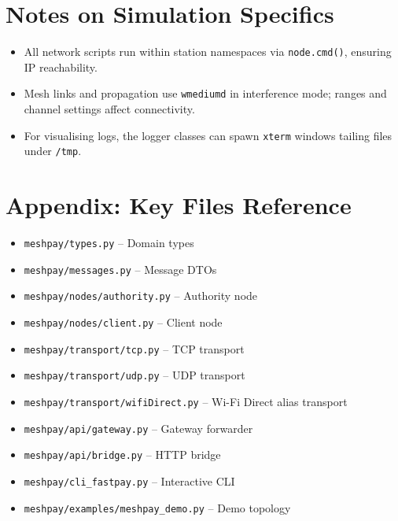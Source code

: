 \documentclass[11pt,a4paper]{article}
\begin{document}
\section{Notes on Simulation Specifics}
\begin{itemize}[noitemsep]
  \item All network scripts run within station namespaces via \texttt{node.cmd()}, ensuring IP reachability.
  \item Mesh links and propagation use \texttt{wmediumd} in interference mode; ranges and channel settings affect connectivity.
  \item For visualising logs, the logger classes can spawn \texttt{xterm} windows tailing files under \texttt{/tmp}.
\end{itemize}

\section{Appendix: Key Files Reference}
\begin{itemize}[noitemsep]
  \item \texttt{meshpay/types.py} – Domain types
  \item \texttt{meshpay/messages.py} – Message DTOs
  \item \texttt{meshpay/nodes/authority.py} – Authority node
  \item \texttt{meshpay/nodes/client.py} – Client node
  \item \texttt{meshpay/transport/tcp.py} – TCP transport
  \item \texttt{meshpay/transport/udp.py} – UDP transport
  \item \texttt{meshpay/transport/wifiDirect.py} – Wi-Fi Direct alias transport
  \item \texttt{meshpay/api/gateway.py} – Gateway forwarder
  \item \texttt{meshpay/api/bridge.py} – HTTP bridge
  \item \texttt{meshpay/cli_fastpay.py} – Interactive CLI
  \item \texttt{meshpay/examples/meshpay_demo.py} – Demo topology
\end{itemize}
\end{document}
